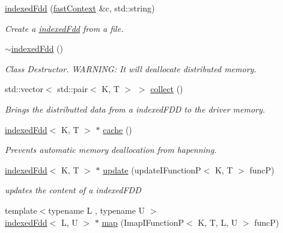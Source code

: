 \begin{DoxyCompactItemize}
\hypertarget{classfaster_1_1indexedFdd_aab165b1eb0d4e7520187fdcca1505c37}{}\label{classfaster_1_1indexedFdd_aab165b1eb0d4e7520187fdcca1505c37} 
\hyperlink{classfaster_1_1indexedFdd_aab165b1eb0d4e7520187fdcca1505c37}{indexed\+Fdd} (\hyperlink{classfaster_1_1fastContext}{fast\+Context} \&c, std\+::string)
\begin{DoxyCompactList}\small\item\em Create a \hyperlink{classfaster_1_1indexedFdd}{indexed\+Fdd} from a file. \end{DoxyCompactList}\item 
\hypertarget{classfaster_1_1indexedFdd_a2ee1eb9ab82f8f6f825f374edf1af0f3}{}\label{classfaster_1_1indexedFdd_a2ee1eb9ab82f8f6f825f374edf1af0f3} 
\hyperlink{classfaster_1_1indexedFdd_a2ee1eb9ab82f8f6f825f374edf1af0f3}{$\sim$indexed\+Fdd} ()
\begin{DoxyCompactList}\small\item\em Class Destructor. W\+A\+R\+N\+I\+NG\+: It will deallocate distributed memory. \end{DoxyCompactList}\item 
std\+::vector$<$ std\+::pair$<$ K, T $>$ $>$ \hyperlink{classfaster_1_1indexedFdd_ae8222d15d17bb139bf07435227010607}{collect} ()
\begin{DoxyCompactList}\small\item\em Brings the distributted data from a indexed\+F\+DD to the driver memory. \end{DoxyCompactList}\item 
\hyperlink{classfaster_1_1indexedFdd}{indexed\+Fdd}$<$ K, T $>$ $\ast$ \hyperlink{group__memmodel_gadadcf78d4c0829655221ecdb29c952e2}{cache} ()
\begin{DoxyCompactList}\small\item\em Prevents automatic memory deallocation from hapenning. \end{DoxyCompactList}\item 
\hyperlink{classfaster_1_1indexedFdd}{indexed\+Fdd}$<$ K, T $>$ $\ast$ \hyperlink{group__update_gac1c08f691a992e6fdf17597d675a6bab}{update} (update\+I\+FunctionP$<$ K, T $>$ funcP)
\begin{DoxyCompactList}\small\item\em updates the content of a indexed\+F\+DD \end{DoxyCompactList}\item 
{\footnotesize template$<$typename L , typename U $>$ }\\\hyperlink{classfaster_1_1indexedFdd}{indexed\+Fdd}$<$ L, U $>$ $\ast$ \hyperlink{group__map_gae5d93ceaa1701aab3b3affc262ad3cc6}{map} (Imap\+I\+FunctionP$<$ K, T, L, U $>$ funcP)

\end{DoxyCompactItemize}
